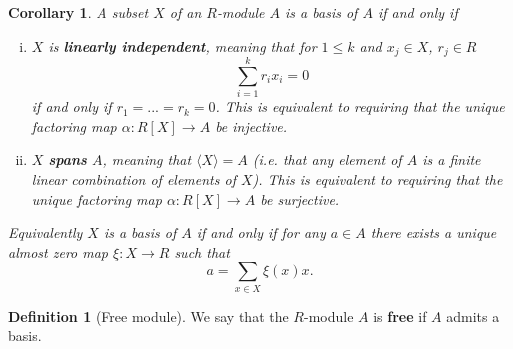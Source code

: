 \documentclass[a4paper,12pt,parskip=half*,chapterprefix=true,numbers=noendperiod]{scrreprt}
\newtheorem{corollary}{Corollary}[section]
\theoremstyle{definition}
\newtheorem{definition}{Definition}[section]
\theoremstyle{remark}
\begin{document}
\begin{corollary}
	A subset $X$ of an $R$-module $A$ is a basis of $A$ if and only if
	\begin{enumerate}[(i)]
		\item $X$ is \textbf{linearly independent}, meaning that for $1\leq k$ and $x_j\in X$, $r_j\in R$
		\begin{equation*}
			\sum_{i=1}^kr_ix_i=0
		\end{equation*}
		if and only if $r_1=...=r_k=0$. This is equivalent to requiring that the unique factoring map $\alpha:R[X]\to A$ be injective.
		\item $X$ \textbf{spans} $A$, meaning that $\langle X\rangle=A$ (i.e. that any element of $A$ is a finite linear combination of elements of $X$). This is equivalent to requiring that the unique factoring map $\alpha:R[X]\to A$ be surjective. 
	\end{enumerate}
	Equivalently $X$ is a basis of $A$ if and only if for any $a\in A$ there exists a unique almost zero map $\xi:X\to R$ such that
	\begin{equation*}
		a=\sum_{x\in X}\xi(x)x.
	\end{equation*}
\end{corollary}

\begin{definition}[Free module]
	We say that the $R$-module $A$ is \textbf{free} if $A$ admits a basis.
\end{definition}
\end{document}
